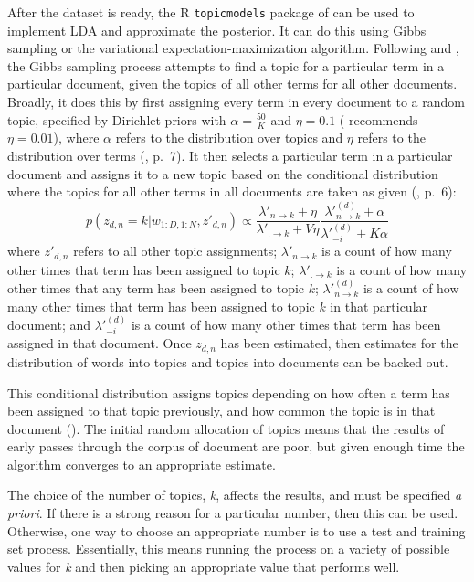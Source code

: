 \documentclass[12pt,]{article}
\theoremstyle{definition}
\theoremstyle{definition}
\theoremstyle{definition}
\theoremstyle{remark}
\begin{document}
After the dataset is ready, the R \texttt{topicmodels} package of
\citet{Grun2011} can be used to implement LDA and approximate the
posterior. It can do this using Gibbs sampling or the variational
expectation-maximization algorithm. Following
\citet{SteyversGriffiths2006} and \citet{Darling2011}, the Gibbs
sampling process attempts to find a topic for a particular term in a
particular document, given the topics of all other terms for all other
documents. Broadly, it does this by first assigning every term in every
document to a random topic, specified by Dirichlet priors with
\(\alpha = \frac{50}{K}\) and \(\eta = 0.1\)
(\citet{SteyversGriffiths2006} recommends \(\eta = 0.01\)), where
\(\alpha\) refers to the distribution over topics and \(\eta\) refers to
the distribution over terms (\citet{Grun2011}, p.~7). It then selects a
particular term in a particular document and assigns it to a new topic
based on the conditional distribution where the topics for all other
terms in all documents are taken as given (\citet{Grun2011}, p.~6):
\[p(z_{d, n}=k | w_{1:D, 1:N}, z'_{d, n}) \propto \frac{\lambda'_{n\rightarrow k}+\eta}{\lambda'_{.\rightarrow k}+V\eta} \frac{\lambda'^{(d)}_{n\rightarrow k}+\alpha}{\lambda'^{(d)}_{-i}+K\alpha} \]
where \(z'_{d, n}\) refers to all other topic assignments;
\(\lambda'_{n\rightarrow k}\) is a count of how many other times that
term has been assigned to topic \(k\); \(\lambda'_{.\rightarrow k}\) is
a count of how many other times that any term has been assigned to topic
\(k\); \(\lambda'^{(d)}_{n\rightarrow k}\) is a count of how many other
times that term has been assigned to topic \(k\) in that particular
document; and \(\lambda'^{(d)}_{-i}\) is a count of how many other times
that term has been assigned in that document. Once \(z_{d,n}\) has been
estimated, then estimates for the distribution of words into topics and
topics into documents can be backed out.

This conditional distribution assigns topics depending on how often a
term has been assigned to that topic previously, and how common the
topic is in that document (\citet{SteyversGriffiths2006}). The initial
random allocation of topics means that the results of early passes
through the corpus of document are poor, but given enough time the
algorithm converges to an appropriate estimate.

The choice of the number of topics, \emph{k}, affects the results, and
must be specified \emph{a priori}. If there is a strong reason for a
particular number, then this can be used. Otherwise, one way to choose
an appropriate number is to use a test and training set process.
Essentially, this means running the process on a variety of possible
values for \emph{k} and then picking an appropriate value that performs
well.
\end{document}
